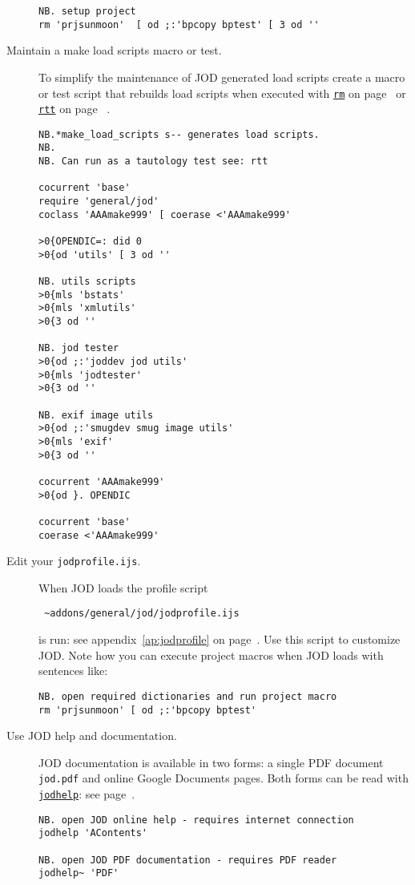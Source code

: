 \begin{description}
\begin{lstlisting}[frame=single,framerule=0pt]
NB. setup project
rm 'prjsunmoon'  [ od ;:'bpcopy bptest' [ 3 od ''
\end{lstlisting}
 
 
\item[Maintain a make load scripts macro or test.] To simplify the maintenance of JOD generated load scripts
create a macro or test script that rebuilds load scripts when executed with \hyperlink{il:rm}{\texttt{rm}} on 
page~\pageref{ss:rm} or \hyperlink{il:rtt}{\texttt{rtt}} on page~\pageref{ss:rtt} . 

\begin{lstlisting}[frame=single,framerule=0pt]
NB.*make_load_scripts s-- generates load scripts.
NB.
NB. Can run as a tautology test see: rtt 

cocurrent 'base'
require 'general/jod'
coclass 'AAAmake999' [ coerase <'AAAmake999'

>0{OPENDIC=: did 0
>0{od 'utils' [ 3 od ''  

NB. utils scripts
>0{mls 'bstats'
>0{mls 'xmlutils'
>0{3 od ''

NB. jod tester 
>0{od ;:'joddev jod utils'
>0{mls 'jodtester'
>0{3 od ''

NB. exif image utils 
>0{od ;:'smugdev smug image utils'
>0{mls 'exif'
>0{3 od ''

cocurrent 'AAAmake999'
>0{od }. OPENDIC

cocurrent 'base'
coerase <'AAAmake999'
\end{lstlisting}

 
\item[Edit your \texttt{jodprofile.ijs}.]  When JOD loads the profile script
\begin{verbatim}
 ~addons/general/jod/jodprofile.ijs
\end{verbatim}
is run: see appendix~\ref{ap:jodprofile} on page~\pageref{ap:jodprofile}.  Use this 
script to customize JOD. Note how you can execute project macros when JOD loads with sentences like:

\begin{lstlisting}[frame=single,framerule=0pt]
NB. open required dictionaries and run project macro
rm 'prjsunmoon' [ od ;:'bpcopy bptest'
\end{lstlisting}
 

\item[Use JOD help and documentation.]  JOD documentation is available in two forms:  
a single PDF document \verb|jod.pdf| and online Google Documents pages. 
Both forms can be read with \hyperlink{il:jodhelp}{\texttt{jodhelp}}: see page~\pageref{ss:jodhelp}.

\begin{lstlisting}[frame=single,framerule=0pt]
NB. open JOD online help - requires internet connection
jodhelp 'AContents'

NB. open JOD PDF documentation - requires PDF reader 
jodhelp~ 'PDF'
\end{lstlisting}

\end{description}